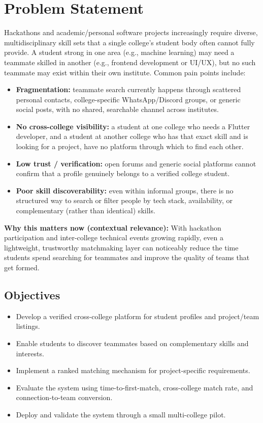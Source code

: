 \documentclass[11pt]{article}
\begin{document}
\section{Problem Statement}
Hackathons and academic/personal software projects increasingly require diverse, multidisciplinary
skill sets that a single college's student body often cannot fully provide. A student strong in
one area (e.g., machine learning) may need a teammate skilled in another (e.g., frontend
development or UI/UX), but no such teammate may exist within their own institute. Common pain
points include:
\begin{itemize}[leftmargin=*]
  \item \textbf{Fragmentation:} teammate search currently happens through scattered personal
  contacts, college-specific WhatsApp/Discord groups, or generic social posts, with no shared,
  searchable channel across institutes.
  \item \textbf{No cross-college visibility:} a student at one college who needs a Flutter
  developer, and a student at another college who has that exact skill and is looking for a
  project, have no platform through which to find each other.
  \item \textbf{Low trust / verification:} open forums and generic social platforms cannot
  confirm that a profile genuinely belongs to a verified college student.
  \item \textbf{Poor skill discoverability:} even within informal groups, there is no structured
  way to search or filter people by tech stack, availability, or complementary (rather than
  identical) skills.
\end{itemize}
\textbf{Why this matters now (contextual relevance):} With hackathon participation and
inter-college technical events growing rapidly, even a lightweight, trustworthy matchmaking
layer can noticeably reduce the time students spend searching for teammates and improve the
quality of teams that get formed.

\subsection{Objectives}
\begin{itemize}[leftmargin=*]
  \item Develop a verified cross-college platform for student profiles and project/team listings.
  \item Enable students to discover teammates based on complementary skills and interests.
  \item Implement a ranked matching mechanism for project-specific requirements.
  \item Evaluate the system using time-to-first-match, cross-college match rate, and
  connection-to-team conversion.
  \item Deploy and validate the system through a small multi-college pilot.
\end{itemize}
\end{document}
